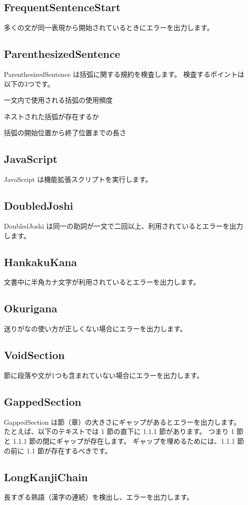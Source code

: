 \subsection{FrequentSentenceStart}
多くの文が同一表現から開始されているときにエラーを出力します。
\subsection{ParenthesizedSentence}
ParenthesizedSentence は括弧に関する規約を検査します。 検査するポイントは以下の3つです。

一文内で使用される括弧の使用頻度

ネストされた括弧が存在するか

括弧の開始位置から終了位置までの長さ
\subsection{JavaScript}
JavaScript は機能拡張スクリプトを実行します。
\subsection{DoubledJoshi}
DoubledJoshi は同一の助詞が一文で二回以上、利用されているとエラーを出力します。
\subsection{HankakuKana}
文書中に半角カナ文字が利用されているとエラーを出力します。
\subsection{Okurigana}
送りがなの使い方が正しくない場合にエラーを出力します。
\subsection{VoidSection}
節に段落や文が1つも含まれていない場合にエラーを出力します。
\subsection{GappedSection}
GappedSection は節（章）の大きさにギャップがあるとエラーを出力します。 たとえば、以下のテキストでは 1 節の直下に 1.1.1 節があります。 つまり 1 節と 1.1.1 節の間にギャップが存在します。 ギャップを埋めるためには、1.1.1 節の前に 1.1 節が存在するべきです。
\subsection{LongKanjiChain}
長すぎる熟語（漢字の連続）を検出し、エラーを出力します。
